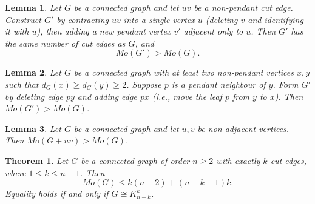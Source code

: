 \documentclass[10pt,a4paper]{amsart}
\newtheorem{lemma}{Lemma}
\newtheorem{theorem}{Theorem}
\begin{document}
\begin{lemma}\label{lem:contract}
Let \(G\) be a connected graph and let \(uv\) be a non‑pendant cut edge. Construct \(G'\) by contracting \(uv\) into a single vertex \(u\) (deleting \(v\) and identifying it with \(u\)), then adding a new pendant vertex \(v'\) adjacent only to \(u\). Then \(G'\) has the same number of cut edges as \(G\), and
\[
Mo(G') > Mo(G).
\]
\end{lemma}

\begin{lemma}\label{lem:movependant}
Let \(G\) be a connected graph with at least two non‑pendant vertices \(x,y\) such that \(d_G(x)\ge d_G(y)\ge 2\). Suppose \(p\) is a pendant neighbour of \(y\). Form \(G'\) by deleting edge \(py\) and adding edge \(px\) (i.e., move the leaf \(p\) from \(y\) to \(x\)). Then \(Mo(G') > Mo(G)\).
\end{lemma}

\begin{lemma}\label{lem:addedge}
Let \(G\) be a connected graph and let \(u,v\) be non‑adjacent vertices. Then \(Mo(G+uv) > Mo(G)\).
\end{lemma}

\begin{theorem}\label{thm:max}
Let \(G\) be a connected graph of order \(n\ge 2\) with exactly \(k\) cut edges, where \(1\le k\le n-1\). Then
\[
Mo(G) \le k(n-2) + (n-k-1)k.
\]
Equality holds if and only if \(G\cong K_{n-k}^k\).
\end{theorem}
\end{document}
